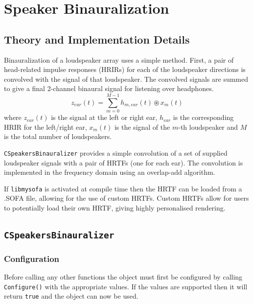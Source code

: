 \documentclass[12pt]{report}
\newcommand{\code}[1]{\texttt{#1}}
\begin{document}
\chapter{Speaker Binauralization}\label{Binauralization}

\section{Theory and Implementation Details}
Binauralization of a loudspeaker array uses a simple method.
First, a pair of head-related impulse responses (HRIRs) for each of the loudspeaker directions is convolved with the signal of that loudspeaker.
The convolved signals are summed to give a final 2-channel binaural signal for listening over headphones.
\begin{equation}
    z_{ear}(t) = \sum_{m = 0}^{M - 1} h_{m,ear}(t)\circledast x_{m}(t)
\end{equation}
where $z_{ear}(t)$ is the signal at the left or right ear, $h_{ear}$ is the corresponding HRIR for the left/right ear, $x_{m}(t)$ is the signal of the $m$-th loudspeaker and $M$ is the total number of loudspeakers.

\code{CSpeakersBinauralizer} provides a simple convolution of a set of supplied loudspeaker signals with a pair of HRTFs (one for each ear).
The convolution is implemented in the frequency domain using an overlap-add algorithm.

If \code{libmysofa} is activated at compile time then the HRTF can be loaded from a .SOFA file, allowing for the use of custom HRTFs.
Custom HRTFs allow for users to potentially load their own HRTF, giving highly personalised rendering.

\section{\code{CSpeakersBinauralizer}}

\subsection{Configuration}

Before calling any other functions the object must first be configured by calling \code{Configure()} with the appropriate values. If the values are supported then it will return \code{true} and the object can now be used.
\end{document}
